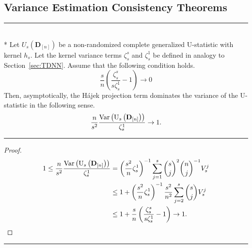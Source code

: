 \subsection{Variance Estimation Consistency Theorems}
\hrule

\begin{lem}\label{lem:Hajek_Dominance}\mbox{}\\*
	Let $U_{s}\left(\mathbf{D}_{[n]}\right)$ be a non-randomized complete generalized U-statistic with kernel $h_s$.
	Let the kernel variance terms $\zeta_{s}^{s}$ and $\zeta_{s}^{1}$ be defined in analogy to Section~\ref{sec:TDNN}.
	Assume that the following condition holds.
	\begin{equation}
		\frac{s}{n}\left(\frac{\zeta_{s}^{s}}{s \zeta_{s}^{1}} - 1\right) \rightarrow 0
	\end{equation}
	Then, asymptotically, the H\'ajek projection term dominates the variance of the U-statistic in the following sense.
	\begin{equation}
		\frac{n}{s^2}\frac{\text{Var}\left(\mathrm{U}_{s}\left(\mathbf{D}_{[n]}\right)\right)}{\zeta_{s}^{1}}
		\rightarrow 1.
	\end{equation}
\end{lem}
\hrule
\begin{proof}
	\begin{equation}
		\begin{aligned}
			1 \leq \frac{n}{s^2}\frac{\text{Var}\left(\mathrm{U}_{s}\left(\mathbf{D}_{[n]}\right)\right)}{\zeta_{s}^{1}}
			 & = \left(\frac{s^2}{n} \zeta_{s}^{1}\right)^{-1} \sum_{j=1}^{s}\binom{s}{j}^2\binom{n}{j}^{-1} V_{s}^{j}     \\
			 & \leq 1 + \left(\frac{s^2}{n} \zeta_{s}^{1}\right)^{-1} \frac{s^2}{n^2} \sum_{j=2}^{s}\binom{s}{j} V_{s}^{j} \\
			 & \leq 1 + \frac{s}{n}\left(\frac{\zeta_{s}^{s}}{s\zeta_{s}^{1}} - 1\right)
			\rightarrow 1.
		\end{aligned}
	\end{equation}
\end{proof}

\hrule

